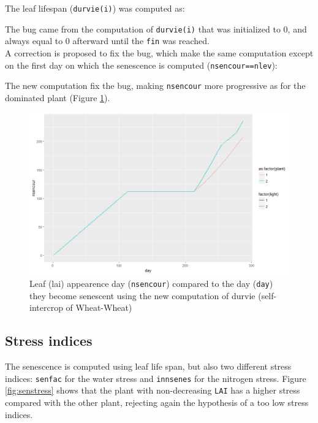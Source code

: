 \documentclass[]{book}
\begin{document}
The leaf lifespan (\texttt{durvie(i)}) was computed as:

The bug came from the computation of \texttt{durvie(i)} that was initialized to 0, and always equal to 0 afterward until the \texttt{fin} was reached.\\
A correction is proposed to fix the bug, which make the same computation except on the first day on which the senescence is computed (\texttt{nsencour==nlev}):

The new computation fix the bug, making \texttt{nsencour} more progressive as for the dominated plant (Figure \ref{fig:nsencourfix}).

\begin{figure}
\centering
\includegraphics{img/LAIhigh_nsencourfix.png}
\caption{\label{fig:nsencourfix}Leaf (lai) appearence day (\texttt{nsencour}) compared to the day (\texttt{day}) they become senescent using the new computation of durvie (self-intercrop of Wheat-Wheat)}
\end{figure}

\hypertarget{stress-indices}{%
\subsection{Stress indices}\label{stress-indices}}

The senescence is computed using leaf life span, but also two different stress indices: \texttt{senfac} for the water stress and \texttt{innsenes} for the nitrogen stress.
Figure \ref{fig:senstress} shows that the plant with non-decreasing \texttt{LAI} has a higher stress compared with the other plant, rejecting again the hypothesis of a too low stress indices.
\end{document}
